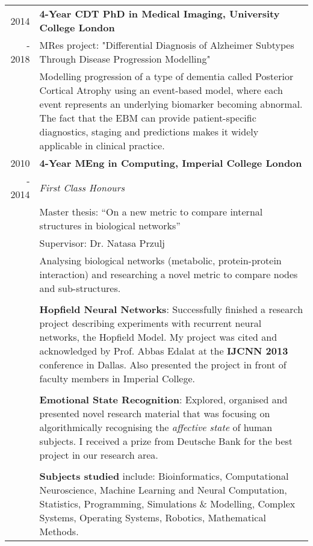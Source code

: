 \documentclass[a4paper,10pt]{article} %
\begin{document}
\begin{tabular}{r|p{15cm}}
2014 & \large\textbf{4-Year CDT PhD in Medical Imaging, University College London}\\
- 2018 & MRes project: "Differential Diagnosis of Alzheimer Subtypes Through Disease Progression Modelling"\\
& Modelling progression of a type of dementia called Posterior Cortical Atrophy using an event-based model, where each event represents an underlying biomarker becoming abnormal. The fact that the EBM can provide patient-specific diagnostics, staging and predictions makes it widely applicable in clinical practice. \\
2010 & \large\textbf{4-Year MEng in Computing, Imperial College London}\\
- 2014 & \emph{First Class Honours} \\
& Master thesis: ``On a new metric to compare internal structures in biological
networks''\\
& \small Supervisor: Dr. Natasa Przulj\\
& Analysing biological networks (metabolic, 
protein-protein interaction) and researching a novel metric to compare nodes and 
sub-structures.\\
& \\
& \textbf{Hopfield Neural Networks}: Successfully finished a research project describing experiments with recurrent neural networks, the Hopfield Model. My project was
cited and acknowledged by Prof. Abbas Edalat at the \textbf{IJCNN 2013} conference in Dallas. Also presented the project in front of faculty members in Imperial College.\\
& \\
& \textbf{Emotional State Recognition}: Explored, organised and presented novel research material that was focusing on algorithmically recognising the \emph{affective state} of
human subjects. I received a prize from Deutsche Bank for the best project in our research area.\\
& \\
& \textbf{Subjects studied} include: Bioinformatics, Computational Neuroscience, 
Machine Learning and Neural Computation, Statistics, Programming, Simulations \& Modelling, Complex Systems,
Operating Systems, Robotics, Mathematical Methods.\\
\end{tabular}


\end{document}
